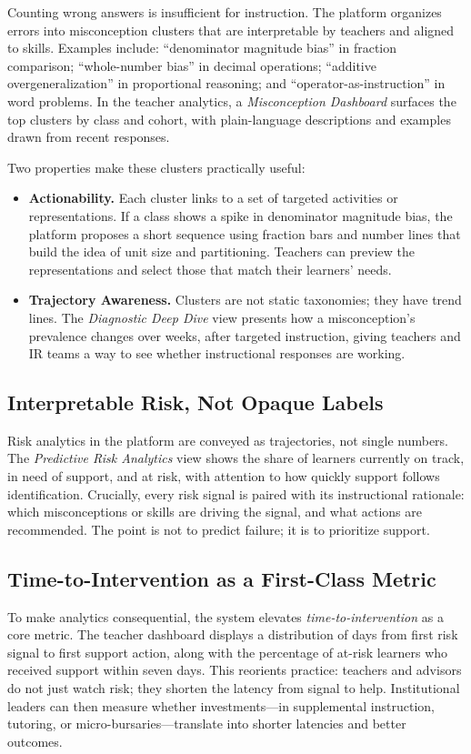 Counting wrong answers is insufficient for instruction. The platform organizes errors into misconception clusters that are interpretable by teachers and aligned to skills. Examples include: ``denominator magnitude bias'' in fraction comparison; ``whole-number bias'' in decimal operations; ``additive overgeneralization'' in proportional reasoning; and ``operator-as-instruction'' in word problems. In the teacher analytics, a \emph{Misconception Dashboard} surfaces the top clusters by class and cohort, with plain-language descriptions and examples drawn from recent responses.

Two properties make these clusters practically useful:

\begin{itemize}
  \item \textbf{Actionability.} Each cluster links to a set of targeted activities or representations. If a class shows a spike in denominator magnitude bias, the platform proposes a short sequence using fraction bars and number lines that build the idea of unit size and partitioning. Teachers can preview the representations and select those that match their learners' needs.
  \item \textbf{Trajectory Awareness.} Clusters are not static taxonomies; they have trend lines. The \emph{Diagnostic Deep Dive} view presents how a misconception's prevalence changes over weeks, after targeted instruction, giving teachers and IR teams a way to see whether instructional responses are working.
\end{itemize}

\subsection{Interpretable Risk, Not Opaque Labels}

Risk analytics in the platform are conveyed as trajectories, not single numbers. The \emph{Predictive Risk Analytics} view shows the share of learners currently on track, in need of support, and at risk, with attention to how quickly support follows identification. Crucially, every risk signal is paired with its instructional rationale: which misconceptions or skills are driving the signal, and what actions are recommended. The point is not to predict failure; it is to prioritize support.

\subsection{Time-to-Intervention as a First-Class Metric}

To make analytics consequential, the system elevates \emph{time-to-intervention} as a core metric. The teacher dashboard displays a distribution of days from first risk signal to first support action, along with the percentage of at-risk learners who received support within seven days. This reorients practice: teachers and advisors do not just watch risk; they shorten the latency from signal to help. Institutional leaders can then measure whether investments---in supplemental instruction, tutoring, or micro-bursaries---translate into shorter latencies and better outcomes.

